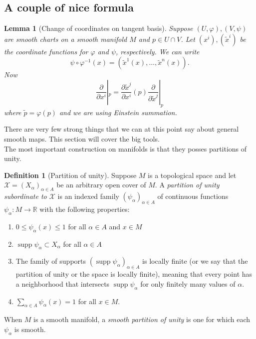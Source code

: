 \documentclass[reqno]{amsart}
\newtheorem{lemma}[theorem]{Lemma}
\theoremstyle{definition}
\newtheorem{definition}[theorem]{Definition}
\theoremstyle{remark}
\DeclareMathOperator{\supp}{supp}
\begin{document}
\subsection{A couple of nice formula}

\begin{lemma}[Change of coordinates on tangent basis]
    Suppose
    $\left( U, \varphi  \right) ,
    \left( V,\psi  \right) $ are smooth charts
    on a smooth manifold $M$ and $p \in U \cap V$.
    Let $\left( x^{i} \right) , \left( \tilde{x}^{i} \right) $ 
    be the coordinate functions for $\varphi $ and $\psi $,
    respectively. 
    We can write
    \[
    \psi \circ \varphi^{-1} (x) =
    \left( \tilde{x}^{1}(x),\ldots,
    \tilde{x}^{n}(x) \right) .
    \] 
    Now
    \[
    \frac{\partial}{\partial x^{i}}|_{p}
    = \frac{\partial \tilde{x}^{j}}{\partial x^{i}}(p)
    \frac{\partial}{\partial \tilde{x}^{j}}|_p
    \] 
    where $\tilde{p} = \varphi (p)$ and we are using
    Einstein summation.
\end{lemma}



There are very few strong things that we can at this point
say about general smooth maps. This section will cover
the big tools.\\

The most important construction on manifolds is
that they posses partitions of unity.

\begin{definition}[Partition of unity]
    Suppose $M$ is a topological space and let
    $\mathcal{X} = \left( X_{\alpha} \right)_{\alpha \in A}$ 
    be an arbitrary open cover
    of $M$. A \textit{partition of unity
    subordinate to $\mathcal{X}$} is
    an indexed family
    $\left( \psi_{\alpha} \right)_{\alpha \in A}$ of 
    continuous functions
    $\psi_{\alpha} \colon M \to \mathbb{R}$ with the
    following properties:
    \begin{enumerate}
        \item $0 \le \psi_{\alpha}(x) \le 1$ for all
            $\alpha \in A$ and $x \in M$ 
        \item $\supp \psi_{\alpha} \subset X_{\alpha}$
            for all $\alpha \in A$ 
        \item The family of supports
            $\left( \supp \psi_{\alpha} \right)_{\alpha
            \in A}$ is locally finite (or we say
            that the partition of unity or the space
            is locally finite), meaning that
            every point has a neighborhood that intersects
            $\supp \psi_{\alpha}$ for only finitely many
            values of $\alpha$.
        \item $\sum_{\alpha \in A}\psi_{\alpha}(x) = 1$
            for all $x \in M$.
    \end{enumerate}
    When $M$ is a smooth manifold, a
    \textit{smooth partition of unity} is one for which
    each $\psi_{\alpha}$ is smooth.
\end{definition}
\end{document}
